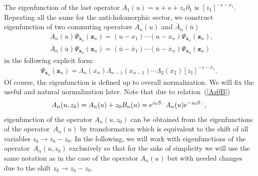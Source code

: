 \documentclass[10pt,a4paper]{amsart}
\numberwithin{equation}{section}
\begin{document}
The eigenfunction of the last operator
$A_{1}(u) = u+s+z_1\partial_1$ is $[z_1]^{-s-x_1}$.
Repeating all the same for the anti-holomorphic
sector, we construct eigenfunction of two commuting
operators $A_n(u)$ and $\bar{A}_n(\bar{u})$
\begin{align}
&A_n(u)
\Psi_{\bm{x}_n}(\bm z_n)= (u-x_1)\cdots(u-x_n)
\Psi_{\bm{x}_n}(\bm z_n),
\nonumber\\
&\bar{A}_n(\bar{u})
\Psi_{\bm{x}_n}(\bm z_n)= (\bar u-\bar x_1)\cdots(\bar u-\bar x_n)
 \Psi_{\bm{x}_n}(\bm z_n)\label{APsi}
\end{align}
in the following explicit form:
\begin{align*}
\Psi_{\bm{x}_n}(\bm z_n) =
\Lambda_n( x_n)
\Lambda_{n-1}( x_{n-1})\cdots
\Lambda_{2}( x_{2}) [z_1]^{-s-x_1} .
\end{align*}
Of course, the eigenfunction is defined up to overall
normalization. We will fix the useful and natural normalization later.
Note that due to relation~(\ref{Az0B})
\begin{align*}
A_n(u,z_0) = A_n(u)+z_0 B_n(u) = {\rm e}^{z_0 S_{-}} A_n(u) {\rm e}^{-z_0 S_{-}},
\end{align*}
eigenfunction of the
operator $A_n(u,z_0)$ can be obtained from the eigenfunctions
of the operator~$A_n(u)$ by transformation
which is equivalent to the shift of all variables $z_k\to z_k-z_0$.
In the following, we will work with eigenfunctions of the operator~$A_n(u,z_0)$
exclusively so that for the sake of simplicity we
will use the same notation as in the case of the operator $A_n(u)$
but with needed changes due to the shift $z_k\to z_k-z_0$.
\end{document}
